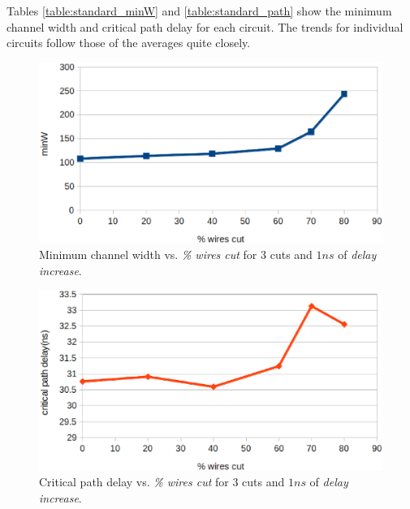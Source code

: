 \documentclass{sig-alternate-2013}
\begin{document}
Tables \ref{table:standard_minW} and \ref{table:standard_path} show the minimum channel width and critical path delay for each circuit. The trends for individual circuits follow those of the averages quite closely.

\begin{figure}[!htbp]
\centering
\includegraphics[width=\linewidth]{standard_minW.eps}
\caption{Minimum channel width vs. \textit{\% wires cut} for 3 cuts and $1ns$ of \textit{delay increase}.}
\label{fig:standard_minW}
\end{figure}

\begin{figure}[!htbp]
\centering
\includegraphics[width=\linewidth]{standard_crit_path.eps}
\caption{Critical path delay vs. \textit{\% wires cut} for 3 cuts and $1ns$ of \textit{delay increase}.}
\label{fig:standard_crit}
\end{figure}
\end{document}
